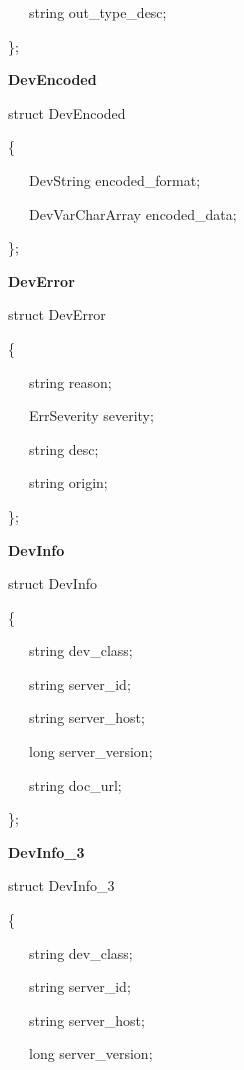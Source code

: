~~~string out\_type\_desc;

\};\\

\begin{flushleft}
\textbf{DevEncoded}
\par\end{flushleft}

struct DevEncoded

\{

~~~DevString encoded\_format;

~~~DevVarCharArray encoded\_data;

\};\\

\begin{flushleft}
\textbf{DevError}
\par\end{flushleft}

struct DevError

\{

~~~string reason;

~~~ErrSeverity severity;

~~~string desc;

~~~string origin;

\};\\

\begin{flushleft}
\textbf{DevInfo}
\par\end{flushleft}

struct DevInfo

\{

~~~string dev\_class;

~~~string server\_id;

~~~string server\_host;

~~~long server\_version;

~~~string doc\_url;

\};\\

\begin{flushleft}
\textbf{DevInfo\_3}
\par\end{flushleft}

struct DevInfo\_3

\{

~~~string dev\_class;

~~~string server\_id;

~~~string server\_host;

~~~long server\_version;

